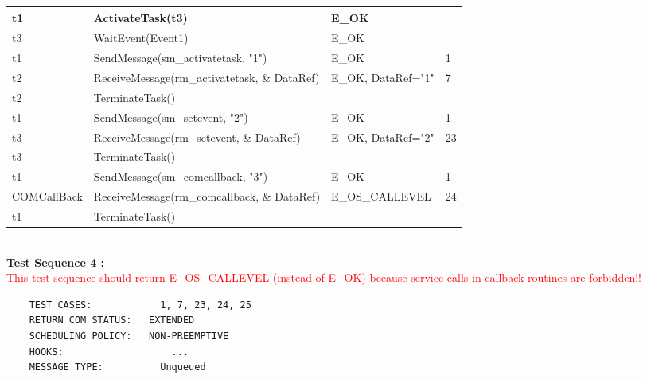\documentclass[10pt]{article}
\newlength{\Li}\settowidth{\Li}{Running}
\newlength{\Lii}\setlength{\Lii}{7cm}
\newlength{\Liiii}\setlength{\Liiii}{0.9cm}
\newlength{\Liii}\setlength{\Liii}{\textwidth} \addtolength{\Liii}{-\Li} \addtolength{\Liii}{-\Lii} \addtolength{\Liii}{-\Liiii}
\begin{document}
	\begin{supertabular}{|p{\Li}|p{\Lii}|p{\Liii}|p{\Liiii}|} \hline 
	t1	& ActivateTask(t3)									& E\_OK				& \\ \hline
	t3	& WaitEvent(Event1)									& E\_OK				& \\ \hline
	t1	& SendMessage(sm\_activatetask, "1")					& E\_OK				& 1 \\ \hline
	t2	& ReceiveMessage(rm\_activatetask, \& DataRef)			& E\_OK, DataRef="1"	& 7 \\ \hline
	t2 	& TerminateTask() 									&					& \\ \hline 
	t1	& SendMessage(sm\_setevent, "2")						& E\_OK				& 1 \\ \hline
	t3	& ReceiveMessage(rm\_setevent, \& DataRef)				& E\_OK, DataRef="2"	& 23 \\ \hline
	t3 	& TerminateTask() 									&					& \\ \hline 
	t1	& SendMessage(sm\_comcallback, "3")					& E\_OK				& 1 \\ \hline
	COMCallBack	& ReceiveMessage(rm\_comcallback, \& DataRef)	& E\_OS\_CALLEVEL	& 24 \\ \hline
	t1	& TerminateTask()									&					&\\ \hline 
	\end{supertabular}\\
	
	\textbf{Test Sequence 4 :}\\
	\textcolor{red}{This test sequence should return E\_OS\_CALLEVEL (instead of E\_OK) because service calls in callback routines are forbidden!!}
	\begin{lstlisting}
	TEST CASES:		       1, 7, 23, 24, 25
	RETURN COM STATUS:	 EXTENDED
	SCHEDULING POLICY:   NON-PREEMPTIVE
	HOOKS:			         ...
	MESSAGE TYPE:	       Unqueued
	\end{lstlisting}
	
	
\end{document}
